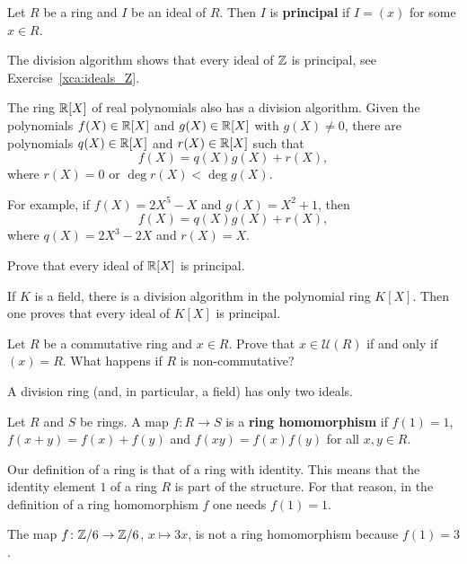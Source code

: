 \begin{definition}
Let $R$ be a ring and $I$ be an ideal of $R$. Then $I$ is \textbf{principal}
if $I=(x)$ for some $x\in R$. 	
\end{definition}

The division algorithm shows that every ideal of $\mathbb{Z}$ is principal, 
see Exercise~\ref{xca:ideals_Z}.  

The ring $\mathbb{R}[X]$ of real polynomials also has a division algorithm. Given the polynomials 
$f(X)\in\mathbb{R}[X]$ and $g(X)\in\mathbb{R}[X]$ with $g(X)\ne 0$, there are  
polynomials $q(X)\in\mathbb{R}[X]$ and $r(X)\in\mathbb{R}[X]$ such that 
\[
f(X)=q(X)g(X)+r(X),
\]
where $r(X)=0$ or $\deg r(X)<\deg g(X)$. 

For example, 
if $f(X)=2X^5-X$ and $g(X)=X^2+1$, then 
\[
f(X)=q(X)g(X)+r(X),
\]
where $q(X)=2X^3-2X$ and $r(X)=X$. 

\begin{exercise}
\label{xca:R[X]_principal}
	Prove that every ideal of $\mathbb{R}[X]$ is principal. 
\end{exercise}

If $K$ is a field, there is a division algorithm in the 
polynomial ring $K[X]$. Then one proves 
that every ideal of $K[X]$ is principal.  

\begin{exercise}
\label{xca:x_unit}
	Let $R$ be a commutative ring and $x\in R$. Prove that $x\in\mathcal{U}(R)$ if and only if
	$(x)=R$. What happens if $R$ is non-commutative?
\end{exercise}

A division ring (and, in particular, a field) has only two ideals. 

\begin{definition}
Let $R$ and $S$ be rings. A map $f\colon R\to S$ is a \textbf{ring homomorphism}  
if $f(1)=1$, $f(x+y)=f(x)+f(y)$ and $f(xy)=f(x)f(y)$ for all $x,y\in R$. 	
\end{definition}

Our definition of a ring is that of a ring with identity. This means
that the identity element $1$ of a ring $R$ 
is part of the structure. For that reason, in 
the definition
of a ring homomorphism $f$ one needs $f(1)=1$.  

\begin{example}
The map $f\colon\mathbb{Z}/6\to\mathbb{Z}/6$, $x\mapsto 3x$, is not a ring homomorphism because
$f(1)=3$. 	
\end{example}
 
